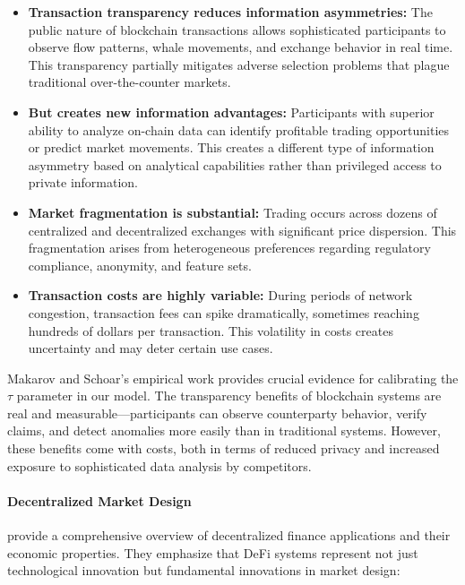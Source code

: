 \begin{itemize}
    \item \textbf{Transaction transparency reduces information asymmetries:} The public nature of blockchain transactions allows sophisticated participants to observe flow patterns, whale movements, and exchange behavior in real time. This transparency partially mitigates adverse selection problems that plague traditional over-the-counter markets.
    
    \item \textbf{But creates new information advantages:} Participants with superior ability to analyze on-chain data can identify profitable trading opportunities or predict market movements. This creates a different type of information asymmetry based on analytical capabilities rather than privileged access to private information.
    
    \item \textbf{Market fragmentation is substantial:} Trading occurs across dozens of centralized and decentralized exchanges with significant price dispersion. This fragmentation arises from heterogeneous preferences regarding regulatory compliance, anonymity, and feature sets.
    
    \item \textbf{Transaction costs are highly variable:} During periods of network congestion, transaction fees can spike dramatically, sometimes reaching hundreds of dollars per transaction. This volatility in costs creates uncertainty and may deter certain use cases.
\end{itemize}

Makarov and Schoar's empirical work provides crucial evidence for calibrating the $\tau$ parameter in our model. The transparency benefits of blockchain systems are real and measurable—participants can observe counterparty behavior, verify claims, and detect anomalies more easily than in traditional systems. However, these benefits come with costs, both in terms of reduced privacy and increased exposure to sophisticated data analysis by competitors.

\paragraph{Decentralized Market Design}

 provide a comprehensive overview of decentralized finance applications and their economic properties. They emphasize that DeFi systems represent not just technological innovation but fundamental innovations in market design:

